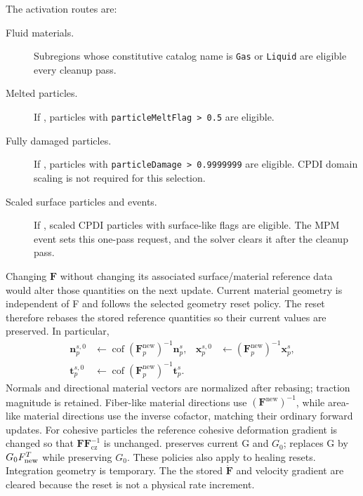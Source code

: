 The activation routes are:
\begin{description}
  \item[Fluid materials.]  Subregions whose constitutive catalog name is \texttt{Gas} or \texttt{Liquid} are eligible every cleanup pass.
  \item[Melted particles.]  If , particles with \texttt{particleMeltFlag > 0.5} are eligible.
  \item[Fully damaged particles.]  If , particles with \texttt{particleDamage > 0.9999999} are eligible.  CPDI domain scaling is not required for this selection.
  \item[Scaled surface particles and events.]  If , scaled CPDI particles with surface-like flags are eligible.  The  MPM event sets this one-pass request, and the solver clears it after the cleanup pass.
\end{description}

Changing $\mathbf{F}$ without changing its associated surface/material reference data would alter those quantities on the next update. Current material geometry is independent of F and follows the selected geometry reset policy.  The reset therefore rebases the stored reference quantities so their current values are preserved.  In particular,
\begin{align}
  \boldsymbol{n}^{s,0}_p
    &\leftarrow \operatorname{cof}(\mathbf{F}^{\mathrm{new}}_p)^{-1}
      \boldsymbol{n}^{s}_p,
  &
  \boldsymbol{x}^{s,0}_p
    &\leftarrow (\mathbf{F}^{\mathrm{new}}_p)^{-1}
      \boldsymbol{x}^{s}_p,\\
  \boldsymbol{t}^{s,0}_p
    &\leftarrow \operatorname{cof}(\mathbf{F}^{\mathrm{new}}_p)^{-1}
      \boldsymbol{t}^{s}_p.
\end{align}
Normals and directional material vectors are normalized after rebasing; traction magnitude is retained.  Fiber-like material directions use $(\mathbf{F}^{\mathrm{new}})^{-1}$, while area-like material directions use the inverse cofactor, matching their ordinary forward updates.  For cohesive particles the reference cohesive deformation gradient is changed so that $\mathbf{F}\mathbf{F}_{\mathrm{cz}}^{-1}$ is unchanged.   preserves current G and $G_0$;  replaces G by $G_0F_{\rm new}^T$ while preserving $G_0$. These policies also apply to healing resets. Integration geometry is temporary. The the stored $\dot{\mathbf{F}}$ and velocity gradient are cleared because the reset is not a physical rate increment.

